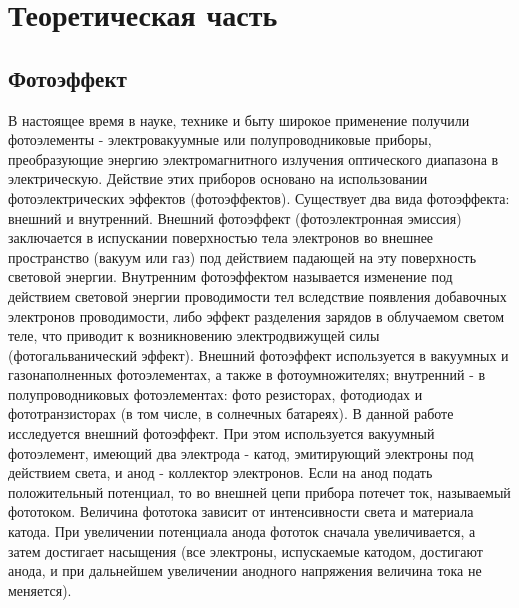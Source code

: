 



\def\labauthors{Виноградов И.Д., Шиков А.П.}
\def\labgroup{430}
\def\labnumber{2}
\def\labtheme{Исследование фотоэффекта и измерение постоянной Планка}
\renewcommand{\vec}{\mathbf}
\renewcommand{\Re}{\operatorname{Re}}
\renewcommand{\Im}{\operatorname{Im}}
\renewcommand{\phi}{\varphi}
\renewcommand{\hat}{\widehat}



\newpage

\section{Теоретическая часть}
\subsection*{Фотоэффект}
В настоящее время в науке, технике и быту широкое применение получили фотоэлементы - электровакуумные или полупроводниковые приборы, преобразующие энергию электромагнитного излучения оптического диапазона в электрическую. Действие этих приборов основано на использовании фотоэлектрических эффектов (фотоэффектов). 
Существует два вида фотоэффекта: внешний и внутренний. Внешний фотоэффект (фотоэлектронная эмиссия) заключается в испускании поверхностью тела электронов во внешнее пространство (вакуум или газ) под действием падающей на эту поверхность световой энергии. Внутренним фотоэффектом называется изменение под действием световой энергии проводимости тел вследствие появления добавочных электронов проводимости, либо эффект разделения зарядов в облучаемом светом теле, что приводит к возникновению электродвижущей силы (фотогальванический эффект). Внешний фотоэффект используется в вакуумных и газонаполненных фотоэлементах, а также в фотоумножителях; внутренний - в полупроводниковых фотоэлементах: фото резисторах, фотодиодах и фототранзисторах (в том числе, в солнечных батареях).
В данной работе исследуется внешний фотоэффект. При этом используется вакуумный фотоэлемент, имеющий два электрода - катод, эмитирующий электроны под действием света, и анод - коллектор электронов. Если на анод подать положительный потенциал, то во внешней цепи прибора потечет ток, называемый фототоком. Величина фототока зависит от интенсивности света и материала катода. При увеличении потенциала анода фототок сначала увеличивается, а затем достигает насыщения (все электроны, испускаемые катодом, достигают анода, и при дальнейшем увеличении анодного напряжения величина тока не меняется).
